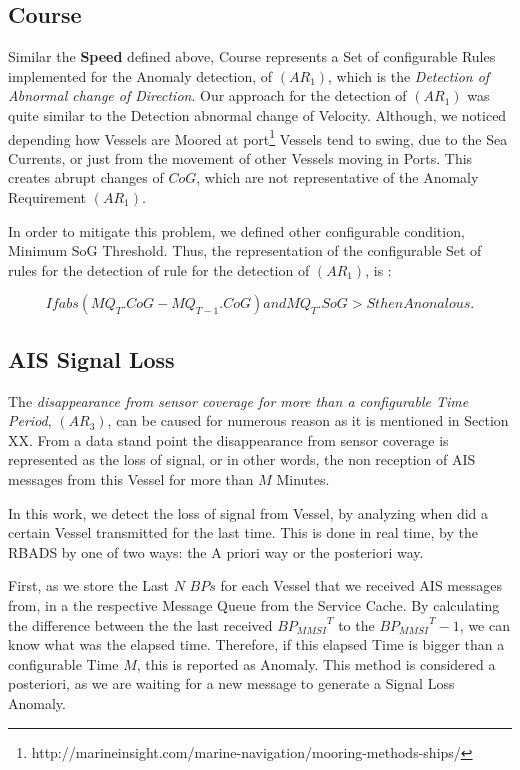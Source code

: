 \subsection{Course}
Similar the \textbf{Speed} defined above, Course represents a Set of configurable Rules implemented for the Anomaly detection, of $(AR_1)$, which is the \textit{Detection of Abnormal change of Direction}. 
Our approach for the detection of $(AR_1)$ was quite similar to the {Detection abnormal change of Velocity}. 
Although, we noticed depending how Vessels are Moored at port\footnote{http://marineinsight.com/marine-navigation/mooring-methods-ships/}  Vessels tend to swing, due to the Sea Currents, or just from the movement of other Vessels moving in Ports. This creates abrupt changes of $CoG$, which are not representative of the Anomaly Requirement $(AR_1)$.

In order to mitigate this problem, we defined other configurable condition, Minimum SoG Threshold. Thus, the representation of the configurable Set of rules for the detection of rule for the detection of $(AR_1)$, is :

\[If abs(MQ_{T}.CoG - MQ_{T-1}.CoG)  and  MQ_T.SoG > S then Anonalous.\]


\subsection{AIS Signal Loss}
The \textit{disappearance from sensor coverage for more than a configurable Time Period}, $(AR_3)$, can be caused for numerous reason as it is mentioned in Section XX. From a data stand point the disappearance from sensor coverage is represented as the loss of signal, or in other words, the non reception of AIS messages from this Vessel for more than $M$ Minutes.

In this work, we detect the loss of signal from Vessel, by analyzing when did a certain Vessel transmitted for the last time. This is done in real time, by the RBADS by one of two ways: the A priori way or the posteriori way.

First, as we store the Last $N$ $BPs$ for each Vessel that we received AIS messages from, in a the respective Message Queue from the Service Cache. By calculating the difference between the the last received ${BP_{MMSI}}^T$ to the ${BP_{MMSI}}^T-1$, we can know what was the elapsed time. Therefore, if this elapsed Time is bigger than a configurable Time $M$, this is reported as Anomaly. This method is considered a posteriori, as we are waiting for a new message to generate a Signal Loss Anomaly.

